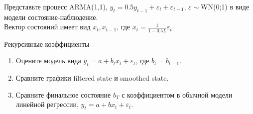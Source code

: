 \begin{solution}
\end{solution}


\begin{problem}Представьте процесс ARMA(1,1),
$y_{t}=0.5y_{t-1}+\varepsilon_{t}+\varepsilon_{t-1}$,
$\varepsilon\sim$WN(0;1) в
виде модели состояние-наблюдение. \\
Вектор состояний имеет вид $x_{t},x_{t-1}$, где
$x_{t}=\frac{1}{1-0.5L}\varepsilon_{t}$ 
\end{problem}
\begin{solution}
\end{solution}



\begin{problem} Рекурсивные коэффициенты 
\begin{enumerate}
\item Oцените модель вида $y_{t}=a+b_{t}x_{t}+\varepsilon_{t}$,
где $b_{t}=b_{t-1}$. 
\item Сравните графики filtered state и smoothed state. 
\item Сравните финальное состояние $b_{T}$ с коэффициентом в
обычной модели линейной регрессии, $y_{t}=a+bx_{t}+\varepsilon_{t}$. 
\end{enumerate} 
\end{problem}
\begin{solution}
\end{solution}



